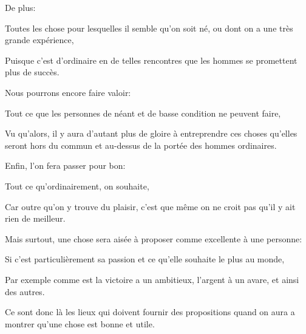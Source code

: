 \bigbreak

De plus:

\begin{emphpar}
	 Toutes les chose pour lesquelles il semble qu'on soit né, ou dont on a une très grande expérience,
\end{emphpar}

Puisque c'est d'ordinaire en de telles rencontres que les hommes se promettent plus de succès. 

\bigbreak

Nous pourrons encore faire valoir:

\begin{emphpar}
	 Tout ce que les personnes de néant et de basse condition ne peuvent faire,
\end{emphpar}

Vu qu'alors, il y aura d'autant plus de gloire à entreprendre ces choses qu'elles seront hors du commun et au-dessus
de la portée des hommes ordinaires. 

\bigbreak

Enfin, l'on fera passer pour bon:

\begin{emphpar}
	 Tout ce qu'ordinairement, on souhaite,
\end{emphpar}

Car outre qu'on y trouve du plaisir, c'est que même on ne croit pas qu'il y ait rien de meilleur.

\bigbreak

Mais surtout, une chose sera aisée à proposer comme excellente à une personne:

\begin{emphpar}
	 Si c'est particulièrement sa passion et ce qu'elle souhaite le plus au monde,
\end{emphpar}

Par exemple comme est la victoire a un ambitieux, l'argent à un avare, et ainsi des autres.

\bigbreak

Ce sont donc là les lieux qui doivent fournir des propositions quand on aura a montrer qu'une chose est bonne et utile.
